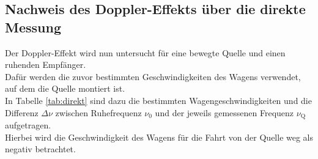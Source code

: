 \subsection{Nachweis des Doppler-Effekts über die direkte Messung}
Der Doppler-Effekt wird nun untersucht für eine bewegte Quelle und einen ruhenden Empfänger.\\
Dafür werden die zuvor bestimmten Geschwindigkeiten des Wagens verwendet, auf dem die Quelle montiert ist.\\
In Tabelle \ref{tab:direkt} sind dazu die bestimmten Wagengeschwindigkeiten und die Differenz $\Delta \nu$ zwischen Ruhefrequenz $\nu_\mathrm{0}$ und der jeweils gemessenen Frequenz $\nu_{\mathrm{Q}}$ aufgetragen.\\
Hierbei wird die Geschwindigkeit des Wagens für die Fahrt von der Quelle weg als negativ betrachtet.
